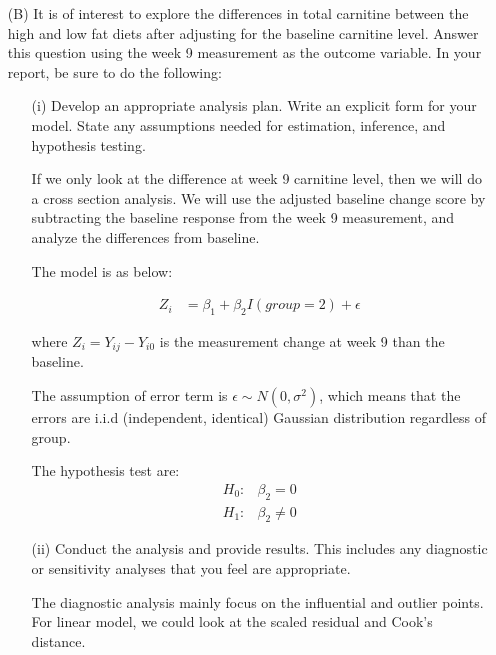 \begin{itemize}
								\vspace{0.2cm}
								\item[(B)] It is of interest to explore the differences in total carnitine between the high and low
													 fat diets after adjusting for the baseline carnitine level. Answer this question using
													 the week 9 measurement as the outcome variable. In your report, be sure to do the following:
													 
												\begin{itemize}
													\vspace{0.2cm}
													\item[(i)] Develop an appropriate analysis plan. Write an explicit form for your model.
																		 State any assumptions needed for estimation, inference, and hypothesis testing.

If we only look at the difference at week 9 carnitine level, then we will do a cross section analysis. We will use the adjusted baseline change score by subtracting the baseline response from the week 9 measurement, and analyze the differences from baseline. 

The model is as below:

\begin{align*}
Z_{i} &=  \beta_{1}  +  \beta_2 I(group= 2) + \epsilon
\end{align*}

where $Z_{i}= Y_{ij} - Y_{i0}$ is the measurement change at week 9 than the baseline. 

The assumption of error term is $\epsilon \sim N(0, \sigma^2)$, which means that the errors are i.i.d (independent, identical) Gaussian distribution regardless of group. 

The hypothesis test are:
\begin{align*}
H_0: & \beta_2 = 0 \\
H_1: & \beta_2 \neq 0
\end{align*}

													\vspace{0.2cm}
												  \item[(ii)] Conduct the analysis and provide results.	This includes any diagnostic or sensitivity analyses
																			that you feel are appropriate.

The diagnostic analysis mainly focus on the influential and outlier points. For linear model, we could look at the scaled residual and Cook's distance.



\end{itemize}
\end{itemize}

